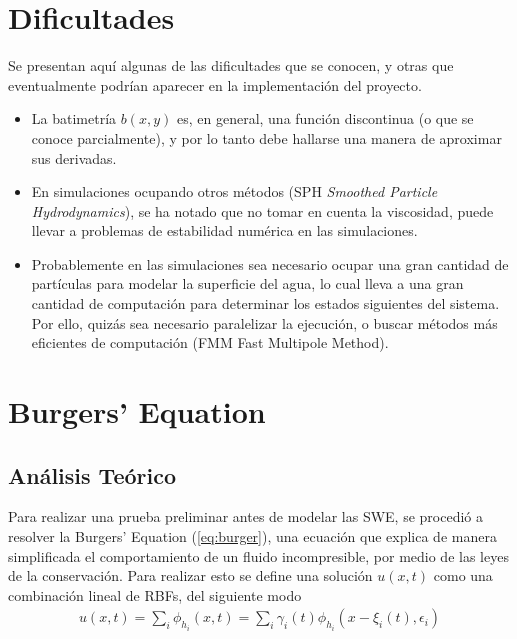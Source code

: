 \documentclass[spanish]{article}
\begin{document}
\section{Dificultades}
Se presentan aquí algunas de las dificultades que se conocen, y otras que eventualmente podrían aparecer en la implementación
del proyecto.
\begin{itemize}
    \item La batimetría $b(x,y)$ es, en general, una función discontinua (o que se conoce parcialmente), y por lo tanto
    debe hallarse una manera de aproximar sus derivadas.
    \item En simulaciones ocupando otros métodos (SPH \textit{Smoothed Particle Hydrodynamics}), se ha notado que no tomar
    en cuenta la viscosidad, puede llevar a problemas de estabilidad numérica en las simulaciones.
    \item Probablemente en las simulaciones sea necesario ocupar una gran cantidad de partículas para modelar la superficie
    del agua, lo cual lleva a una gran cantidad de computación para determinar los estados siguientes del sistema. Por ello,
    quizás sea necesario paralelizar la ejecución, o buscar métodos más eficientes de computación (FMM Fast Multipole
    Method).
\end{itemize}                                                                                                                                                                                                                                                                                                                                                                                                     
\newpage  
\section{Burgers' Equation}
  \subsection{Análisis Teórico}
    Para realizar una prueba preliminar antes de modelar las SWE, se procedió a resolver la Burgers' Equation (\ref{eq:burger}), una ecuación que explica de manera simplificada el comportamiento de un fluido incompresible, por medio de las leyes de la conservación. Para realizar esto se define una solución $u(x,t)$ como una combinación lineal de RBFs, del siguiente modo
    \begin{align}
      u(x,t) = \sum_{i} \phi_{h_i}(x,t) = \sum_i \gamma_i(t)\phi_{h_i}(x-\xi_i(t),\epsilon_i)
    \end{align}
    
\end{document}
